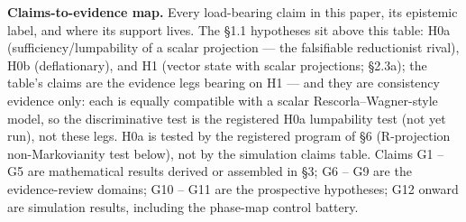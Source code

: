 \documentclass[11pt,twocolumn]{article}
\theoremstyle{gttdef}
\theoremstyle{gttplain}
\begin{document}
\textbf{Claims-to-evidence map.} Every load-bearing claim in this paper, its epistemic label, and where its support lives. The \S{}1.1 hypotheses sit above this table: H0a (sufficiency/lumpability of a scalar projection --- the falsifiable reductionist rival), H0b (deflationary), and H1 (vector state with scalar projections; \S{}2.3a); the table's claims are the evidence legs bearing on H1 --- and they are consistency evidence only: each is equally compatible with a scalar Rescorla--Wagner-style model, so the discriminative test is the registered H0a lumpability test (not yet run), not these legs. H0a is tested by the registered program of \S{}6 (R-projection non-Markovianity test below), not by the simulation claims table. Claims G1 -- G5 are mathematical results derived or assembled in \S{}3; G6 -- G9 are the evidence-review domains; G10 -- G11 are the prospective hypotheses; G12 onward are simulation results, including the phase-map control battery.
\end{document}
